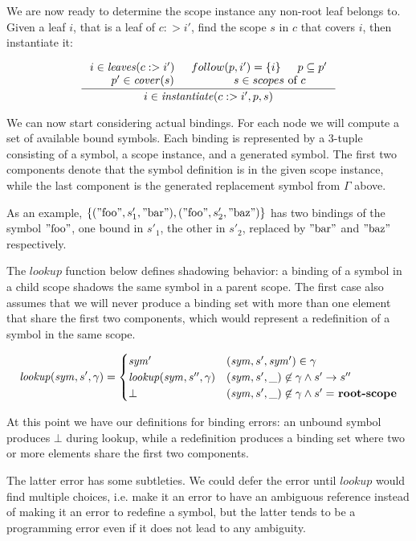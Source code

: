 \documentclass{kththesis}
\begin{document}
We are now ready to determine the scope instance any non-root leaf belongs to. Given a leaf $i$, that is a leaf of $c :> i'$, find the scope $s$ in $c$ that covers $i$, then instantiate it:

$$
\inference{
  i \in \leaves(c :> i') &
  follow(p, i') = \{i\} &
  p \subseteq p' \\
  p' \in \cover(s) &
  s \in scopes \text{ of } c
}{i \in \instantiate(c :> i', p, s)}
$$

We can now start considering actual bindings. For each node we will compute a set of available bound symbols. Each binding is represented by a 3-tuple consisting of a symbol, a scope instance, and a generated symbol. The first two components denote that the symbol definition is in the given scope instance, while the last component is the generated replacement symbol from $\Gamma$ above.

As an example, $\{(\text{''foo''}, s'_1, \text{''bar''}), (\text{''foo''}, s'_2, \text{''baz''})\}$ has two bindings of the symbol $\text{''foo''}$, one bound in $s'_1$, the other in $s'_2$, replaced by $\text{''bar''}$ and $\text{''baz''}$ respectively.

\newcommand{\lookup}{\ensuremath{\mathit{lookup}}}

The $\lookup$ function below defines shadowing behavior: a binding of a symbol in a child scope shadows the same symbol in a parent scope. The first case also assumes that we will never produce a binding set with more than one element that share the first two components, which would represent a redefinition of a symbol in the same scope.

$$
\lookup(\mathit{sym}, s', \gamma) =
\begin{cases}
\mathit{sym}' & (\mathit{sym}, s', \mathit{sym}') \in \gamma \\
\lookup(\mathit{sym}, s'', \gamma) & (\mathit{sym}, s', \_) \not\in \gamma \land s' -> s'' \\
\bot & (\mathit{sym}, s', \_) \not\in \gamma \land s' =\ \rootscope
\end{cases}
$$

At this point we have our definitions for binding errors: an unbound symbol produces $\bot$ during lookup, while a redefinition produces a binding set where two or more elements share the first two components.

The latter error has some subtleties. We could defer the error until $\lookup$ would find multiple choices, i.e. make it an error to have an ambiguous reference instead of making it an error to redefine a symbol, but the latter tends to be a programming error even if it does not lead to any ambiguity.
\end{document}
